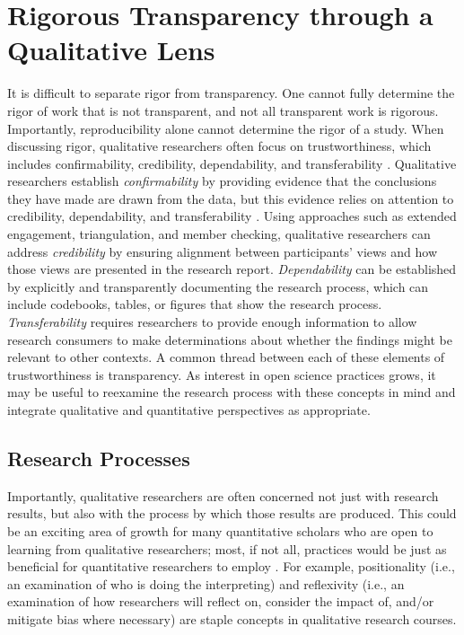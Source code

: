 \documentclass[authordate, meta]{jote-new-article}
\begin{document}
\section{Rigorous Transparency through a Qualitative Lens}



It is difficult to separate rigor from transparency. One cannot fully determine the rigor of work that is not transparent, and not all transparent work is rigorous. Importantly, reproducibility alone cannot determine the rigor of a study. When discussing rigor, qualitative researchers often focus on trustworthiness, which includes confirmability, credibility, dependability, and transferability \parencites{Lincoln1986}{Stahl2020}. Qualitative researchers establish \emph{confirmability }by providing evidence that the conclusions they have made are drawn from the data, but this evidence relies on attention to credibility, dependability, and transferability \parencites{Lincoln1985}{Nowell2017}{Tobin2004}. Using approaches such as extended engagement, triangulation, and member checking, qualitative researchers can address \emph{credibility }by ensuring alignment between participants’ views and how those views are presented in the research report. \emph{Dependability }can be established by explicitly and transparently documenting the research process, which can include codebooks, tables, or figures that show the research process. \emph{Transferability }requires researchers to provide enough information to allow research consumers to make determinations about whether the findings might be relevant to other contexts. A common thread between each of these elements of trustworthiness is transparency. As interest in open science practices grows, it may be useful to reexamine the research process with these concepts in mind and integrate qualitative and quantitative perspectives as appropriate.







\subsection{Research Processes}



Importantly, qualitative researchers are often concerned not just with research results, but also with the process by which those results are produced. This could be an exciting area of growth for many quantitative scholars who are open to learning from qualitative researchers; most, if not all, practices would be just as beneficial for quantitative researchers to employ \parencites[see, for example,][]{Hope2019}. For example, positionality (i.e., an examination of who is doing the interpreting) and reflexivity (i.e., an examination of how researchers will reflect on, consider the impact of, and/or mitigate bias where necessary) are staple concepts in qualitative research courses.
\end{document}
